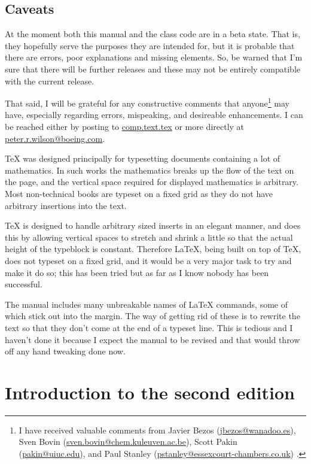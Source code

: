 \documentclass[10pt,letterpaper]{memoir}
\begin{document}
\section{Caveats}

    At the moment both this manual and the class code are in a beta state.
That is, they hopefully serve the purposes they are intended for, but 
it is probable that there are errors, poor explanations and missing
elements. So, be warned that I'm sure that there will be further releases
and these may not be entirely compatible with the current release.

    That said, I will be grateful for any constructive comments that 
anyone\footnote{I have received valuable comments from
Javier Bezos (\url{jbezos@wanadoo.es}), 
Sven Bovin (\url{sven.bovin@chem.kuleuven.ac.be}),
Scott Pakin (\url{pakin@uiuc.edu}),
and
Paul Stanley (\url{pstanley@essexcourt-chambers.co.uk})
.}
may have, especially regarding errors, mispeaking, and desireable 
enhancements. I can be reached either by posting to \url{comp.text.tex}
or more directly at \url{peter.r.wilson@boeing.com}.

    TeX was designed principally for typesetting documents containing a 
lot of mathematics. In such works the mathematics breaks up the flow
of the text on the page, and the vertical space required for displayed
mathematics is arbitrary. Most non-technical books are typeset on a fixed
grid as they do not have arbitrary insertions into the text.

    TeX is designed to handle arbitrary sized inserts in an elegant manner,
and does this by allowing vertical spaces to stretch and shrink a little
so that the actual height of the typeblock is constant. Therefore LaTeX, being
built on top of TeX, does not typeset on a fixed grid, and it would be a 
very major task to try and make it do so; this has been tried but as far as 
I know nobody has been successful.

    The manual includes many unbreakable names of LaTeX commands,
some of which stick out into the margin. The way of getting rid of these
is to rewrite the text so that they don't come at the end of a typeset
line. This is tedious and I haven't done it because I expect the manual
to be revised and that would throw off any hand tweaking done now.

\chapter{Introduction to the second edition}
\end{document}

